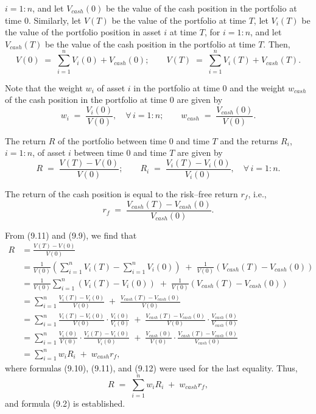 
$i = 1:n$, and let $V_{cash}(0)$ be the value of the cash position in the portfolio at
time 0. Similarly, let $V(T)$ be the value of the portfolio at time $T$, let $V_i(T)$
be the value of the portfolio position in asset $i$ at time $T$, for $i = 1:n$, and let
$V_{cash}(T)$ be the value of the cash position in the portfolio at time $T$. Then,
\begin{equation}
V(0) \;=\; \sum_{i=1}^n V_i(0) + V_{cash}(0); \qquad V(T) \;=\; \sum_{i=1}^n V_i(T) +
V_{cash}(T).
\end{equation}

Note that the weight $w_i$ of asset $i$ in the portfolio at time 0 and the weight
$w_{cash}$ of the cash position in the portfolio at time 0 are given by
\begin{equation}
w_i \;=\; \frac{V_i(0)}{V(0)}, \quad \forall\, i = 1:n; \qquad w_{cash} \;=\;
\frac{V_{cash}(0)}{V(0)}.
\end{equation}

The return $R$ of the portfolio between time 0 and time $T$ and the returns $R_i$,
$i = 1:n$, of asset $i$ between time 0 and time $T$ are given by
\begin{equation}
R \;=\; \frac{V(T)-V(0)}{V(0)}; \qquad R_i \;=\; \frac{V_i(T)-V_i(0)}{V_i(0)}, \quad
\forall\, i = 1:n.
\end{equation}

The return of the cash position is equal to the risk--free return $r_f$, i.e.,
\begin{equation}
r_f \;=\; \frac{V_{cash}(T)-V_{cash}(0)}{V_{cash}(0)}.
\end{equation}

From (9.11) and (9.9), we find that
\begin{align*}
R &= \frac{V(T)-V(0)}{V(0)} \\
&= \frac{1}{V(0)}\left(\sum_{i=1}^n V_i(T) - \sum_{i=1}^n V_i(0)\right) \;+\;
\frac{1}{V(0)}(V_{cash}(T)-V_{cash}(0)) \\
&= \frac{1}{V(0)}\sum_{i=1}^n (V_i(T)-V_i(0)) \;+\; \frac{1}{V(0)}(V_{cash}(T)-V_{cash}(0)) \\
&= \sum_{i=1}^n \frac{V_i(T)-V_i(0)}{V(0)} \;+\; \frac{V_{cash}(T)-V_{cash}(0)}{V(0)} \\
&= \sum_{i=1}^n \frac{V_i(T)-V_i(0)}{V(0)}\cdot\frac{V_i(0)}{V_i(0)} \;+\;
\frac{V_{cash}(T)-V_{cash}(0)}{V(0)}\cdot\frac{V_{cash}(0)}{V_{cash}(0)} \\
&= \sum_{i=1}^n \frac{V_i(0)}{V(0)}\cdot\frac{V_i(T)-V_i(0)}{V_i(0)} \;+\;
\frac{V_{cash}(0)}{V(0)}\cdot\frac{V_{cash}(T)-V_{cash}(0)}{V_{cash}(0)} \\
&= \sum_{i=1}^n w_iR_i \;+\; w_{cash}r_f,
\end{align*}
where formulas (9.10), (9.11), and (9.12) were used for the last equality. Thus,
\[
R \;=\; \sum_{i=1}^n w_iR_i \;+\; w_{cash}r_f,
\]
and formula (9.2) is established.

